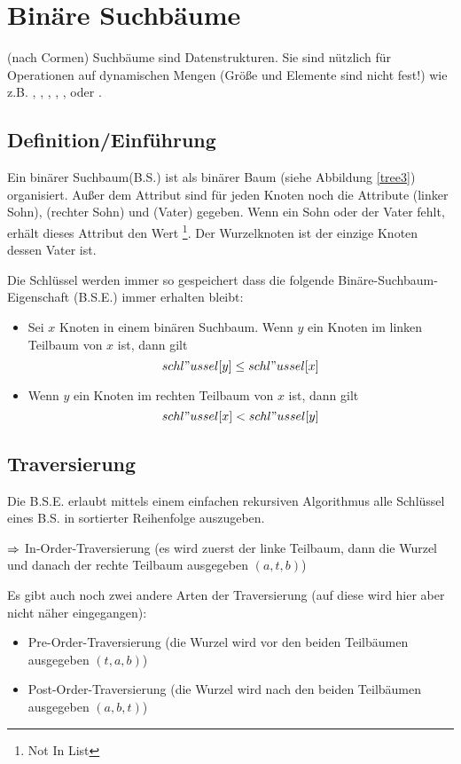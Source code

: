 \documentclass[a4paper,twoside,DIV15,BCOR12mm]{scrbook}
\begin{document}
\section{Binäre Suchbäume}
(nach Cormen) Suchbäume sind Datenstrukturen. Sie sind nützlich für Operationen auf dynamischen Mengen
(Größe und Elemente sind nicht fest!) wie z.B. , , ,
, ,  oder .

\subsection{Definition/Einführung}
Ein binärer Suchbaum(B.S.) ist als binärer Baum (siehe Abbildung \ref{tree3}) organisiert. Außer dem 
Attribut  sind für jeden Knoten noch die Attribute  (linker Sohn), 
(rechter Sohn) und (Vater) gegeben. Wenn ein Sohn oder der Vater fehlt, erhält dieses Attribut 
den Wert \footnote{Not In List}. Der Wurzelknoten ist der einzige Knoten dessen Vater  ist.

Die Schlüssel werden immer so gespeichert dass die folgende Binäre-Suchbaum-Eigenschaft (B.S.E.) immer
erhalten bleibt:
\begin{itemize}
\item Sei $x$ Knoten in einem binären Suchbaum. Wenn $y$ ein Knoten im linken Teilbaum von $x$ ist, 
			dann gilt $$ schl"ussel[y] \leq schl"ussel[x] $$
\item Wenn $y$ ein Knoten im rechten Teilbaum von $x$ ist, dann gilt
			$$ schl"ussel[x] < schl"ussel[y] $$
\end{itemize}

\subsection{Traversierung}
Die B.S.E. erlaubt mittels einem einfachen rekursiven Algorithmus alle Schlüssel eines B.S. in sortierter 
Reihenfolge auszugeben.
\begin{description}
\item{$\Rightarrow$} In-Order-Traversierung (es wird zuerst der linke Teilbaum, dann die Wurzel und danach der 
								rechte Teilbaum ausgegeben $(a,t,b)$)
\end{description}
Es gibt auch noch zwei andere Arten der Traversierung (auf diese wird hier aber nicht näher eingegangen):
\begin{itemize}
\item Pre-Order-Traversierung (die Wurzel wird vor den beiden Teilbäumen ausgegeben $(t,a,b)$)
\item Post-Order-Traversierung (die Wurzel wird nach den beiden Teilbäumen ausgegeben $(a,b,t)$)
\end{itemize}
\end{document}
